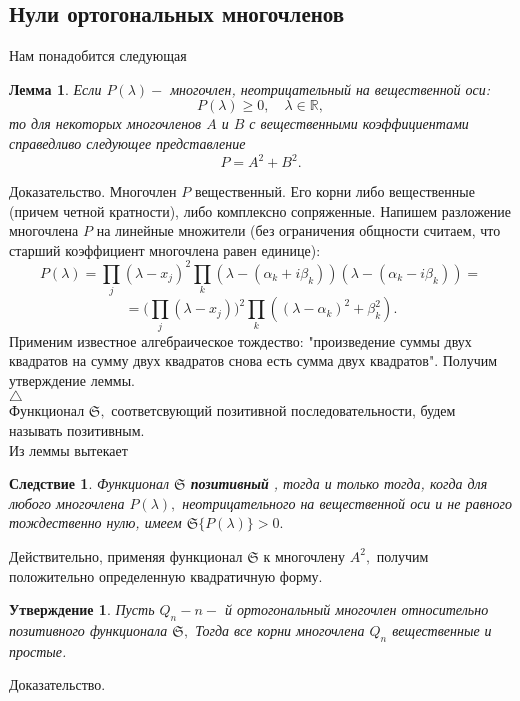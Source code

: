 \documentclass[12pt,a4paper]{article}
\theoremstyle{plain}   \newtheorem{Pro}{Задача}
\newtheorem{Sta}{Утверждение}
\newtheorem{Cor}{Следствие}
\newtheorem{Lem}{Лемма}
\begin{document}
\subsection{Нули ортогональных многочленов}
$ \; $
\\

Нам понадобится следующая
\begin{Lem}
Если
$ P( \lambda ) - $
многочлен, неотрицательный на вещественной оси:
$$
  P( \lambda ) \geq 0, \quad \lambda \in \mathbb{R},
$$
то для некоторых многочленов
$ A $ и $ B $
с вещественными коэффициентами справедливо следующее представление
$$
  P=A^2 +B^2 .
$$
\end{Lem}
{\Large Доказательство.}
Многочлен
$ P $
вещественный. Его корни либо вещественные
(причем четной кратности), либо комплексно сопряженные.
Напишем разложение многочлена
$ P $
на линейные множители (без ограничения общности считаем, что
старший коэффициент многочлена равен единице):
$$
  P(\lambda )=\prod _j (\lambda -x_j )^2
  \prod _k (\lambda -(\alpha _k +i \beta _k ))
  (\lambda -(\alpha _k -i\beta _k ))=
$$
$$
  =\biggl ( \prod _j (\lambda -x_j ) \biggr )^2
  \prod _k ( ( \lambda -\alpha _k )^2 + \beta _k ^2 ).
$$
Применим известное алгебраическое тождество: "произведение
суммы двух квадратов на сумму двух квадратов снова есть
сумма двух квадратов". Получим утверждение леммы.\\
$ \triangle $
\\
Функционал
$ \mathfrak{S} , $
соответсвующий позитивной последовательности, будем называть
позитивным.\\
Из леммы вытекает
\begin{Cor}
Функционал
$ \mathfrak{S} $
{\bfseries позитивный}
, тогда и только тогда,
когда для любого многочлена
$ P( \lambda ) , $
неотрицательного на вещественной оси и не равного тождественно нулю,
имеем
$ \mathfrak{S} \{ P( \lambda ) \} >0. $
\end{Cor}
Действительно, применяя функционал
$ \mathfrak{S} $
к многочлену
$ A^2 , $
получим положительно определенную квадратичную форму.
\begin{Sta}
Пусть
$ Q_n - n- $
й ортогональный многочлен относительно позитивного функционала
$ \mathfrak{S} , $
Тогда все корни многочлена
$ Q_n $
вещественные и простые.
\end{Sta}
{\Large Доказательство.}
\end{document}
